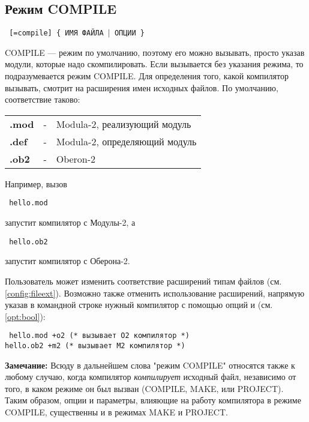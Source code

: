 \subsection{Режим COMPILE}\label{xc:modes:compile}

\begin{flushleft} \tt
    \xc{} [=compile] \{ ИМЯ ФАЙЛА $|$ ОПЦИИ \}
\end{flushleft}
COMPILE --- режим по умолчанию, поэтому его можно вызывать, просто
указав модули, которые надо скомпилировать.
Если \xc{} вызывается без указания режима, то подразумевается
режим COMPILE. Для определения того, какой компилятор вызывать,
\xc{} смотрит на расширения имен исходных файлов. По умолчанию, 
соответствие таково:
\begin{flushleft}
\begin{tabular}{lcl}
\bf        .mod  &-& Modula-2, реализующий модуль \\
\bf        .def  &-& Modula-2, определяющий модуль \\
\bf        .ob2  &-& Oberon-2  \\
\end{tabular}
\end{flushleft}

Например, вызов
\begin{flushleft} \tt
        \xc{} hello.mod
\end{flushleft}
запустит компилятор с Модулы-2, а
\begin{flushleft} \tt
        \xc{} hello.ob2
\end{flushleft}
запустит компилятор с Оберона-2.

Пользователь может изменить соответствие расширений типам файлов
(см. \ref{config:fileext}). Возможно также отменить использование 
расширений, напрямую указав в командной строке нужный компилятор
с помощью опций  и  (см. \ref{opt:bool}):
\begin{flushleft} \tt%
\xc{} hello.mod +o2  (* вызывает O2 компилятор *)  \\
\xc{} hello.ob2 +m2  (* вызывает M2 компилятор *)
\end{flushleft}

{\bf Замечание:} Всюду в дальнейшем слова "режим COMPILE"
относятся также к любому случаю, когда компилятор
{\it компилирует} исходный файл, независимо от того, 
в каком режиме он был вызван (COMPILE, MAKE, или PROJECT).
Таким образом, опции и параметры, влияющие на работу компилятора в 
режиме COMPILE, существенны и в режимах MAKE и PROJECT.

